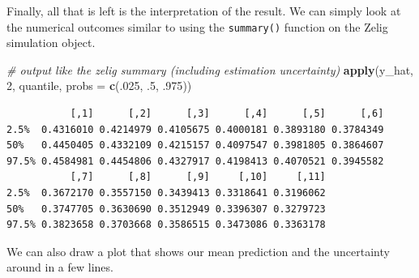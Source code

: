 \documentclass[]{article}
\newenvironment{Shaded}{\begin{snugshade}}{\end{snugshade}}
\newcommand{\CommentTok}[1]{\textcolor[rgb]{0.56,0.35,0.01}{\textit{#1}}}
\newcommand{\DataTypeTok}[1]{\textcolor[rgb]{0.13,0.29,0.53}{#1}}
\newcommand{\DecValTok}[1]{\textcolor[rgb]{0.00,0.00,0.81}{#1}}
\newcommand{\FloatTok}[1]{\textcolor[rgb]{0.00,0.00,0.81}{#1}}
\newcommand{\KeywordTok}[1]{\textcolor[rgb]{0.13,0.29,0.53}{\textbf{#1}}}
\newcommand{\NormalTok}[1]{#1}
\begin{document}
Finally, all that is left is the interpretation of the result. We can simply look at the numerical outcomes similar to using the \texttt{summary()} function on the Zelig simulation object.

\begin{Shaded}
\begin{Highlighting}[]
\CommentTok{# output like the zelig summary (including estimation uncertainty)}
\KeywordTok{apply}\NormalTok{(y_hat, }\DecValTok{2}\NormalTok{, quantile, }\DataTypeTok{probs =} \KeywordTok{c}\NormalTok{(.}\DecValTok{025}\NormalTok{, }\FloatTok{.5}\NormalTok{, }\FloatTok{.975}\NormalTok{))}
\end{Highlighting}
\end{Shaded}

\begin{verbatim}
           [,1]      [,2]      [,3]      [,4]      [,5]      [,6]
2.5%  0.4316010 0.4214979 0.4105675 0.4000181 0.3893180 0.3784349
50%   0.4450405 0.4332109 0.4215157 0.4097547 0.3981805 0.3864607
97.5% 0.4584981 0.4454806 0.4327917 0.4198413 0.4070521 0.3945582
           [,7]      [,8]      [,9]     [,10]     [,11]
2.5%  0.3672170 0.3557150 0.3439413 0.3318641 0.3196062
50%   0.3747705 0.3630690 0.3512949 0.3396307 0.3279723
97.5% 0.3823658 0.3703668 0.3586515 0.3473086 0.3363178
\end{verbatim}

We can also draw a plot that shows our mean prediction and the uncertainty around in a few lines.
\end{document}
